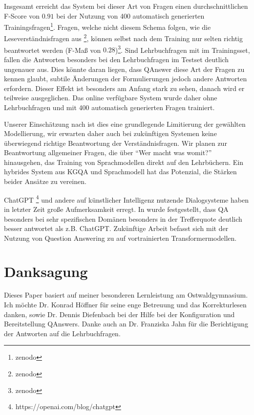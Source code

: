 \documentclass[utf8,biblatex]{lni}
\begin{document}
Insgesamt erreicht das System bei dieser Art von Fragen einen durchschnittlichen F-Score von $0.91$ bei der Nutzung von 400 automatisch generierten Trainingsfragen\footnote{zenodo}.
Fragen, welche nicht diesem Schema folgen, wie die Leseverständnisfragen aus \cite{bb}\footnote{zenodo}, können selbst nach dem Training nur selten richtig beantwortet werden (F-Maß von $0.28$)\footnote{zenodo}.
Sind Lehrbuchfragen mit im Trainingsset, fallen die Antworten besonders bei den Lehrbuchfragen im Testset deutlich ungenauer aus.
Dies könnte daran liegen, dass QAnswer diese Art der Fragen zu kennen glaubt, subtile Änderungen der Formulierungen jedoch andere Antworten erfordern.
Dieser Effekt ist besonders am Anfang stark zu sehen, danach wird er teilweise ausgeglichen.
Das online verfügbare System wurde daher ohne Lehrbuchfragen und mit 400 automatisch generierten Fragen trainiert.

Unserer Einschätzung nach ist dies eine grundlegende Limitierung der gewählten Modellierung, wir erwarten daher auch bei zukünftigen Systemen keine überwiegend richtige Beantwortung der Verständnisfragen.
Wir planen zur Beantwortung allgemeiner Fragen, die über \enquote{Wer macht was womit?} hinausgehen, das Training von Sprachmodellen direkt auf den Lehrbüchern.
Ein hybrides System aus KGQA und Sprachmodell hat das Potenzial, die Stärken beider Ansätze zu vereinen.

ChatGPT \footnote{https://openai.com/blog/chatgpt} und andere auf künstlicher Intelligenz nutzende Dialogsysteme haben in letzter Zeit große Aufmerksamkeit erregt.
In \cite{gptvsqa} wurde festgestellt, dass QA besonders bei sehr spezifischen Domänen besonders in der Trefferquote deutlich besser antwortet als z.B. ChatGPT.
Zukünftige Arbeit befasst sich mit der Nutzung von Question Answering zu \cite{bb} auf vortrainierten Transformermodellen.

\section{Danksagung}

Dieses Paper basiert auf meiner besonderen Lernleistung am Ostwaldgymnasium.
Ich möchte Dr. Konrad Höffner für seine enge Betreuung und das Korrekturlesen danken, sowie Dr. Dennis Diefenbach bei der Hilfe bei der Konfiguration und Bereitstellung QAnswers.
Danke auch an Dr. Franziska Jahn für die Berichtigung der Antworten auf die Lehrbuchfragen. 

\printbibliography
\end{document}
